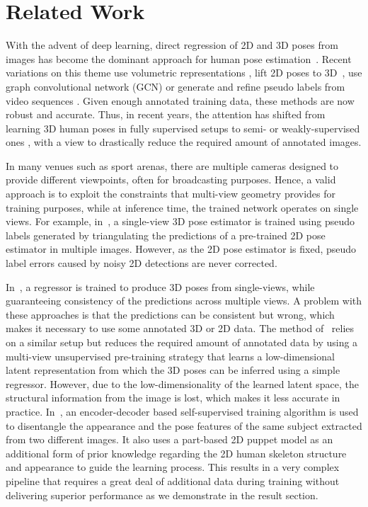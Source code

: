 \documentclass[runningheads]{llncs}
\begin{document}
%
 

\section{Related Work}

With the advent of deep learning, direct regression of 2D and 3D poses from images has become the dominant approach for human pose estimation~\cite{Li14e,Newell16,Mehta17b,Rogez17,Rogez18}. Recent variations on this theme use volumetric representations \cite{Iskakov19}, lift 2D poses to 3D~\cite{Martinez17a,Iqbal20}, use graph convolutional network (GCN) \cite{Ci19,Cai19,Zeng20,Liu20f,Zou21} or generate and refine pseudo labels from video sequences \cite{Li19c,Pavllo19}. Given enough annotated training data, these methods are now robust and accurate. Thus, in recent years, the attention has shifted from learning 3D human poses in fully supervised setups to semi- or weakly-supervised ones \cite{Pavlakos17,Kanazawa19b,Wang19m,Pavlakos19b,Wandt19,Chen19g}, with a view to drastically reduce the required amount of annotated images.


In many venues such as sport arenas, there are multiple cameras designed to provide different viewpoints, often for broadcasting purposes. Hence, a valid approach is to exploit the constraints that multi-view geometry provides for training purposes, while at inference time, the trained network operates on single views. For example, in~\cite{Kocabas19},  a single-view 3D pose estimator is trained using pseudo labels generated by triangulating the predictions of a pre-trained 2D pose estimator in multiple images. However, as the 2D pose estimator is fixed, pseudo label errors caused by noisy 2D detections are never corrected.


In~\cite{Rhodin18a,Iqbal20}, a regressor is trained to produce 3D poses from single-views, while guaranteeing consistency of the predictions across multiple views. A problem with these approaches is that the predictions can be consistent but wrong, which makes it necessary to use some annotated 3D or 2D data. The method of~\cite{Rhodin18b} relies on a similar setup but reduces the required amount of annotated data by using a multi-view unsupervised pre-training strategy that learns a low-dimensional latent representation from which the 3D poses can be inferred using a simple regressor. However, due to the low-dimensionality of the learned latent space, the structural information from the image is lost, which makes it less accurate in practice.
In~\cite{Kundu20}, an encoder-decoder based self-supervised training algorithm is used to disentangle the appearance and the pose features of the same subject extracted from two different images. It also uses a part-based 2D puppet model as an additional form of prior knowledge regarding the 2D human skeleton structure and appearance to guide the learning process. This results in a very complex pipeline that requires a great deal of additional data during training without delivering superior performance as we demonstrate in the result section.
\end{document}

